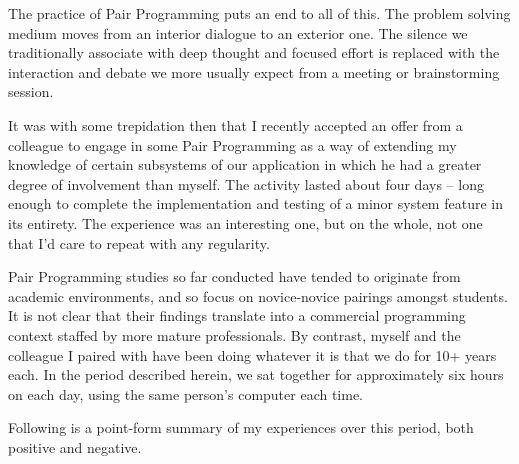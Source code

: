 \documentclass{article}
\begin{document}
The practice of Pair Programming puts an end to all of this. The problem
solving medium moves from an interior dialogue to an exterior one. The
silence we traditionally associate with deep thought and focused effort
is replaced with the interaction and debate we more usually expect from
a meeting or brainstorming session.

It was with some trepidation then that I recently accepted an offer from
a colleague to engage in some Pair Programming as a way of extending my
knowledge of certain subsystems of our application in which he had a
greater degree of involvement than myself. The activity lasted about
four days -- long enough to complete the implementation and testing of a
minor system feature in its entirety. The experience was an interesting
one, but on the whole, not one that I'd care to repeat with any
regularity.

Pair Programming studies so far conducted have tended to originate from
academic environments, and so focus on novice-novice pairings amongst
students. It is not clear that their findings translate into a
commercial programming context staffed by more mature professionals. By
contrast, myself and the colleague I paired with have been doing
whatever it is that we do for 10+ years each. In the period described
herein, we sat together for approximately six hours on each day, using
the same person's computer each time.

Following is a point-form summary of my experiences over this period,
both positive and negative.
\end{document}
